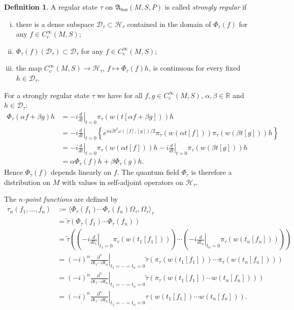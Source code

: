 \documentclass[a4paper,11pt]{amsart}
\theoremstyle{definition}
\newtheorem{definition}[thm]{Definition}
\begin{document}
\begin{definition}\label{def:strongreg}
A regular state $\tau$ on ${\mathfrak{A}_\mathrm{bos}}(M,S,P)$ is called {\em strongly regular} if
\begin{enumerate}[(i)]
\item there is a dense subspace ${\mathcal{D}}_\tau\subset {\mathcal{H}}_\tau$ contained in the domain of $\Phi_\tau(f)$ for any $f\in{C^\infty_\mathrm{c}}(M,S)$;
\item $\Phi_\tau(f)({\mathcal{D}}_\tau)\subset {\mathcal{D}}_\tau$ for any $f\in{C^\infty_\mathrm{c}}(M,S)$;
\item the map ${C^\infty_\mathrm{c}}(M,S) \to {\mathcal{H}}_\tau$, $f \mapsto \Phi_\tau(f)h$, is continuous for every fixed $h\in{\mathcal{D}}_\tau$.
\end{enumerate}
\end{definition}

For a strongly regular state $\tau$ we have for all $f,g\in{C^\infty_\mathrm{c}}(M,S)$, $\alpha,\beta\in{\mathbb{R}}$ and $h\in{\mathcal{D}}_\tau$:
\begin{align*}
\Phi_\tau(\alpha f + \beta g)h
&=
-i{\left.\frac{d}{dt}\right|_{t=0}} \pi_\tau(w(t[\alpha f +\beta g]))h \\
&=
-i{\left.\frac{d}{dt}\right|_{t=0}}\left\{ e^{i\alpha\beta t^2\omega([f],[g])/2}\pi_\tau(w(\alpha t[f]))\pi_\tau(w(\beta t[g]))h\right\} \\
&=
-i{\left.\frac{d}{dt}\right|_{t=0}} \pi_\tau(w(\alpha t[f]))h - i{\left.\frac{d}{dt}\right|_{t=0}}\pi_\tau(w(\beta t[g]))h \\
&=
\alpha \Phi_\tau(f)h + \beta\Phi_\tau(g)h.
\end{align*}
Hence $\Phi_\tau(f)$ depends linearly on $f$.
The quantum field $\Phi_\tau$ is therefore a distribution on $M$ with values in self-adjoint operators on ${\mathcal{H}}_\tau$.

The {\em $n$-point functions}  are defined by
\begin{align*}
\tau_n(f_1,\ldots,f_n)
&:=
{{\langle}{\Phi_\tau(f_1)\cdots\Phi_\tau(f_n)\Omega_\tau},{\Omega_\tau}{\rangle}_\tau} \\
&=
\tilde\tau\left(\Phi_\tau(f_1)\cdots\Phi_\tau(f_n)\right)\\
&=
\tilde\tau\left(\left(-i{\left.\frac{d}{dt_{{1}}}\right|_{t_{{1}}=0}} \pi_\tau(w(t_1[f_1]))\right)\cdots \left(-i{\left.\frac{d}{dt_{{n}}}\right|_{t_{{n}}=0}} \pi_\tau(w(t_n[f_n]))\right)\right) \\
&=
(-i)^n {\left.\frac{\partial^n}{\partial t_1 \cdots \partial t_n}\right|_{t_1=\cdots =t_n=0}} \tilde\tau\left(\pi_\tau(w(t_1[f_1]))\cdots \pi_\tau(w(t_n[f_n]))\right) \\
&=
(-i)^n {\left.\frac{\partial^n}{\partial t_1 \cdots \partial t_n}\right|_{t_1=\cdots =t_n=0}} \tilde\tau\left(\pi_\tau(w(t_1[f_1])\cdots w(t_n[f_n]))\right) \\
&=
(-i)^n {\left.\frac{\partial^n}{\partial t_1 \cdots \partial t_n}\right|_{t_1=\cdots =t_n=0}} \tau\left(w(t_1[f_1])\cdots w(t_n[f_n])\right) .
\end{align*}
\end{document}
